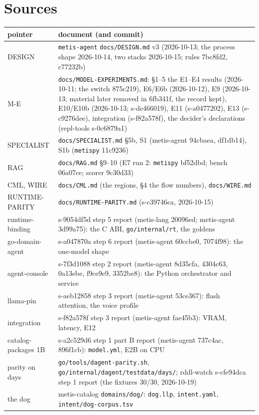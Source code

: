 \documentclass[11pt]{article}
\newcommand{\metispy}{\texttt{metispy}}
\newcommand{\agent}{\texttt{metis-agent}}
\begin{document}
\section*{Sources}

\begin{small}
\begin{tabular}{@{}p{3.6cm}p{11.2cm}@{}}
\toprule
pointer & document (and commit) \\
\midrule
DESIGN & \agent{} \texttt{docs/DESIGN.md} v3 (2026-10-13; the process shape 2026-10-14, two stacks 2026-10-15; rules 7bc8fd2, c77232b) \\
M-E & \texttt{docs/MODEL-EXPERIMENTS.md}: \S1--5 the E1--E4 results (2026-10-11; the switch 875c219), E6/E6b (2026-10-12), E9 (2026-10-13; material later removed in 6fb341f, the record kept), E10/E10b (2026-10-13; s-de466019), E11 (s-a0477202), E13 (s-c9276dee), integration (s-f82a578f), the decider's declarations (repl-tools s-0c6879a1) \\
SPECIALIST & \texttt{docs/SPECIALIST.md} \S5b, S1 (metis-agent 94cbaea, df1db14), S1b (\metispy{} 11c9236) \\
RAG & \texttt{docs/RAG.md} \S9--10 (E7 run 2: \metispy{} bf52dbd; bench 06a07ce; scorer 9c30d33) \\
CML, WIRE & \texttt{docs/CML.md} (the regions, \S4 the flow numbers), \texttt{docs/WIRE.md} \\
RUNTIME-PARITY & \texttt{docs/RUNTIME-PARITY.md} (s-c39746ca, 2026-10-15) \\
runtime-binding & s-9054df5d step 5 report (metis-lang 20096ed; metis-agent 3d99a75): the C ABI, \texttt{go/internal/rt}, the goldens \\
go-domain-agent & s-a047870a step 6 report (metis-agent 60ccbe0, 7074f98): the one-model shape \\
agent-console & s-7f3d1088 step 2 report (metis-agent 8d35cfa, 4304c63, 0a13ebe, f9ce9e9, 3352be8): the Python orchestrator and service \\
llama-pin & s-aeb12858 step 3 report (metis-agent 53ce367): flash attention, the voice profile \\
integration & s-f82a578f step 3 report (metis-agent fae45b3): VRAM, latency, E12 \\
catalog-packages 1B & s-a2c529d6 step 1 part B report (metis-agent 737c4ac, 896f1cb): \texttt{model.yml}, E2B on CPU \\
parity on days & \texttt{go/tools/dagent-parity.sh}, \texttt{go/internal/dagent/testdata/days/}; rddl-watch s-cfe94dca step 1 report (the fixtures 30/30, 2026-10-19) \\
the dog & metis-catalog \texttt{domains/dog/}: \texttt{dog.llp}, \texttt{intent.yaml}, \texttt{intent/dog-corpus.tsv} \\
\bottomrule
\end{tabular}
\end{small}
\end{document}
